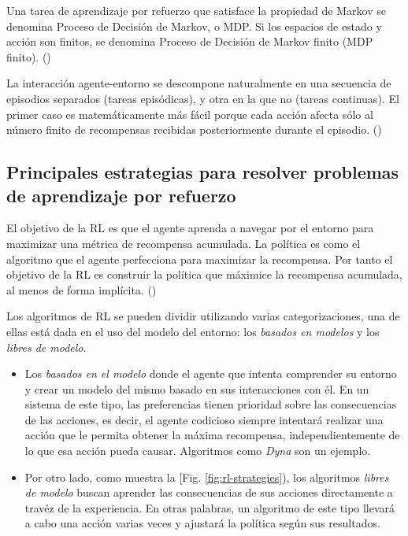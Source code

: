 Una tarea de aprendizaje por refuerzo que satisface la propiedad de Markov se denomina Proceso de Decisión de Markov, o MDP. Si los espacios de estado y acción son finitos, se denomina Proceso de Decisión de Markov finito (MDP finito). (\cite{wiering2012reinforcement})

La interacción agente-entorno se descompone naturalmente en una secuencia de episodios separados (tareas episódicas), y otra en la que no (tareas continuas). El primer caso es matemáticamente más fácil porque cada acción afecta sólo al número finito de recompensas recibidas posteriormente durante el episodio. (\cite{wiering2012reinforcement})

\subsection{Principales estrategias para resolver problemas de aprendizaje por refuerzo}

El objetivo de la RL es que el agente aprenda a navegar por el entorno para maximizar una métrica de recompensa acumulada. La política es como el algoritmo que el agente perfecciona para maximizar la recompensa. Por tanto el objetivo de la RL es construir la política que máximice la recompensa acumulada, al menos de forma implícita. (\cite{sutton1998introduction})

Los algoritmos de RL se pueden dividir utilizando varias categorizaciones, una de ellas está dada en el uso del modelo del entorno: los \textit{basados en modelos} y los \textit{libres de modelo}.

\begin{itemize}
\item Los \textit{basados en el modelo} donde el agente que intenta comprender su entorno y crear un modelo del mismo basado en sus interacciones con él. En un sistema de este tipo, las preferencias tienen prioridad sobre las consecuencias de las acciones, es decir, el agente codicioso siempre intentará realizar una acción que le permita obtener la máxima recompensa, independientemente de lo que esa acción pueda causar. Algoritmos como \textit{Dyna} son un ejemplo.

\item Por otro lado, como muestra la [Fig. \ref{fig:rl-strategies}), los algoritmos \textit{libres de modelo} buscan aprender las consecuencias de sus acciones directamente a travéz de la experiencia. En otras palabras, un algoritmo de este tipo llevará a cabo una acción varias veces y ajustará la política según sus resultados.
\end{itemize}

